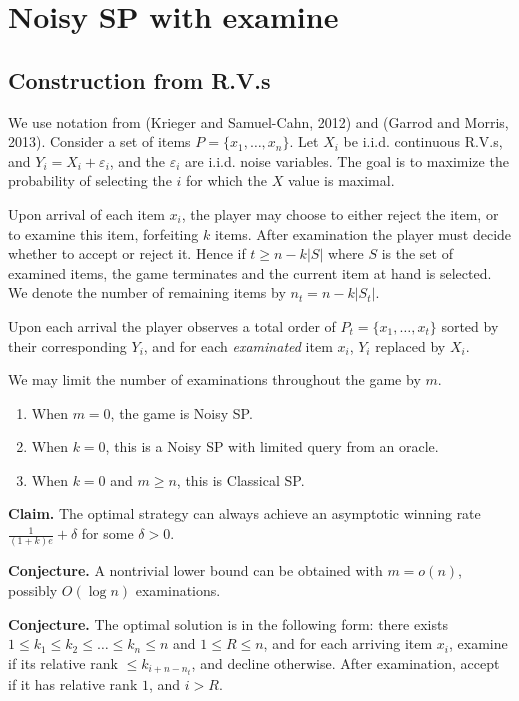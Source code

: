 \section{Noisy SP with examine}
\subsection{Construction from R.V.s}

We use notation from (Krieger and Samuel-Cahn, 2012) and (Garrod and Morris, 2013). Consider a set of items $P = \{x_1, \ldots, x_n\}$. Let $X_i$ be i.i.d. continuous R.V.s, and $Y_i = X_i + \varepsilon_i$, and the $\varepsilon_i$ are i.i.d. noise variables. The goal is to maximize the probability of selecting the $i$ for which the $X$ value is maximal.

Upon arrival of each item $x_i$, the player may choose to either reject the item, or to examine this item, forfeiting $k$ items. After examination the player must decide whether to accept or reject it. Hence if $t \ge n - k|S|$ where $S$ is the set of examined items, the game terminates and the current item at hand is selected. We denote the number of remaining items by $n_t = n - k |S_t|$.

Upon each arrival the player observes a total order of $P_t = \{x_1,\ldots,x_t\}$ sorted by their corresponding $Y_i$, and for each \textit{examinated} item  $x_i$,  $Y_i$ replaced by $X_i$.

We may limit the number of examinations throughout the game by $m$.
\begin{enumerate}
	\item When $m=0$, the game is Noisy SP.
	\item When $k=0$, this is a Noisy SP with limited query from an oracle.
	\item When $k=0$ and $m\ge  n$, this is Classical SP.
\end{enumerate}

\textbf{Claim.} The optimal strategy can always achieve an asymptotic winning rate $\frac{1}{(1+k)e} + \delta$ for some $\delta > 0$.

\textbf{Conjecture.} A nontrivial lower bound can be obtained with $m = o(n)$, possibly $O(\log n)$ examinations.

\textbf{Conjecture.} The optimal solution is in the following form: there exists $1\le k_1\le k_2 \le \ldots\le k_n \le n$ and $1\le R\le n$, and for each arriving item $x_i$, examine if its relative rank $\le  k_{i+n-n_t}$, and decline otherwise. After examination, accept if it has relative rank $1$, and $i>R$.



